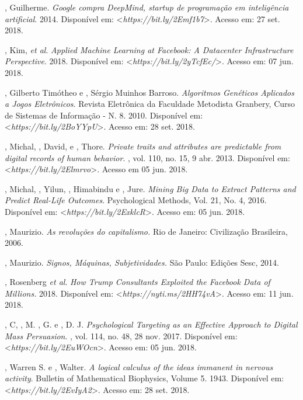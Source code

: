 \begin{Parskip}
, Guilherme. \emph{Google compra DeepMind, startup de programação
em inteligência artificial}. 2014. Disponível em: \textless{}\emph{https://bit.ly/2Emf1b7}\textgreater{}. Acesso em: 27 set. 2018.

, Kim, \emph{et al}. \emph{Applied Machine Learning at Facebook: A
Datacenter Infrastructure Perspective}. 2018. Disponível em: \textless{}\emph{https://bit.ly/2yTcfEc/}\textgreater{}. Acesso em: 07 jun. 2018.

, Gilberto Timótheo e , Sérgio Muinhos Barroso.
\emph{Algoritmos Genéticos Aplicados a Jogos Eletrônicos}. Revista
Eletrônica da Faculdade Metodista Granbery, Curso de Sistemas de
Informação - N. 8. 2010. Disponível em: \textless{}\emph{https://bit.ly/2BoYYpU}\textgreater{}. Acesso em: 28 set. 2018.

, Michal, , David, e , Thore.
\emph{Private traits and attributes are predictable from digital
records of human behavior}. , vol. 110, no. 15, 9 abr. 2013.
Disponível em: \textless{}\emph{https://bit.ly/2Elmrvo}\textgreater{}. Acesso em 05 jun. 2018.

, Michal, , Yilun, , Himabindu e , Jure. \emph{Mining Big Data to Extract Patterns and Predict Real-Life
Outcomes}. Psychological Methods, Vol. 21, No. 4, 2016. Disponível em:
\textless{}\emph{https://bit.ly/2ExklcR}\textgreater{}. Acesso em: 05 jun. 2018.

, Maurizio. \emph{As revoluções do capitalismo.} Rio de
Janeiro: Civilização Brasileira, 2006.

, Maurizio. \emph{Signos, Máquinas, Subjetividades.} São
Paulo: Edições Sesc, 2014.

, Rosenberg \emph{et al}. \emph{How Trump Consultants Exploited the
Facebook Data of Millions.} 2018. Disponível em: \textless{}\emph{https://nyti.ms/2HH74vA}\textgreater{}. Acesso em: 11 jun. 2018.

, C, , M. , G. e , D. J.
\emph{Psychological Targeting as an Effective Approach to Digital Mass
Persuasion}. , vol. 114, no. 48, 28 nov. 2017. Disponível em:
\textless{}\emph{https://bit.ly/2EuWOcn}\textgreater{}. Acesso em: 05 jun. 2018.

, Warren S. e , Walter. \emph{A logical calculus of the
ideas immanent in nervous activity}. Bulletin of Mathematical
Biophysics, Volume 5. 1943. Disponível em:
\textless{}\emph{https://bit.ly/2EvIyA2}\textgreater{}. Acesso em: 28 set. 2018.


\end{Parskip}

